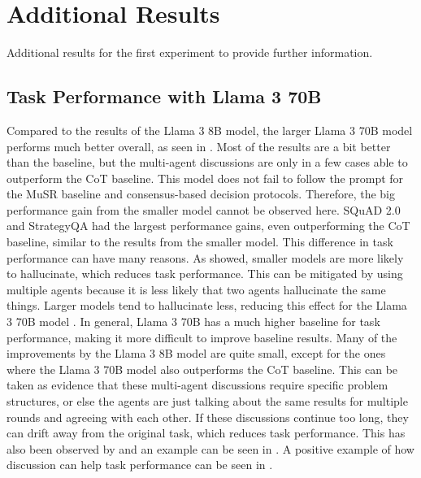
\section{Additional Results}

Additional results for the first experiment to provide further information.
\subsection{Task Performance with Llama 3 70B}
\label{app:decision_70b}

Compared to the results of the Llama 3 8B model, the larger Llama 3 70B model performs much better overall, as seen in . Most of the results are a bit better than the baseline, but the multi-agent discussions are only in a few cases able to outperform the \ac{CoT} baseline. This model does not fail to follow the prompt for the MuSR baseline and consensus-based decision protocols. Therefore, the big performance gain from the smaller model cannot be observed here. SQuAD 2.0 and StrategyQA had the largest performance gains, even outperforming the \ac{CoT} baseline, similar to the results from the smaller model. This difference in task performance can have many reasons. As \citet{li_dawn_2024} showed, smaller models are more likely to hallucinate, which reduces task performance. This can be mitigated by using multiple agents because it is less likely that two agents hallucinate the same things. Larger models tend to hallucinate less, reducing this effect for the Llama 3 70B model \citep{li_dawn_2024}. In general, Llama 3 70B has a much higher baseline for task performance, making it more difficult to improve baseline results. Many of the improvements by the Llama 3 8B model are quite small, except for the ones where the Llama 3 70B model also outperforms the \ac{CoT} baseline. This can be taken as evidence that these multi-agent discussions require specific problem structures, or else the agents are just talking about the same results for multiple rounds and agreeing with each other. If these discussions continue too long, they can drift away from the original task, which reduces task performance. This has also been observed by \citet{becker_multi-agent_2024} and an example can be seen in . A positive example of how discussion can help task performance can be seen in .

